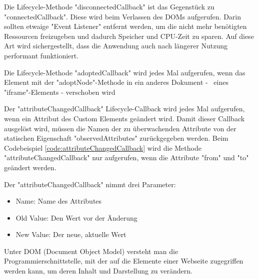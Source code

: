 
Die Lifecycle-Methode "{\ttfamily disconnectedCallback}" ist das Gegenstück zu \linebreak "{\ttfamily connectedCallback}".
Diese wird beim Verlassen des DOMs aufgerufen. Darin sollten etwaige "Event Listener" entfernt werden, um die nicht mehr benötigten Ressourcen freizugeben und dadurch Speicher und CPU-Zeit zu sparen. 
Auf diese Art wird sichergestellt, dass die Anwendung auch nach längerer Nutzung performant funktioniert. \cite{MDNWebCustomElements}


Die Lifecycle-Methode "{\ttfamily adoptedCallback}" wird jedes Mal aufgerufen, wenn das Element mit der "{\ttfamily adoptNode}"-Methode in ein anderes Dokument - \zb\ eines "{\ttfamily iframe}"-Elements - verschoben wird \cite{MDNWebCustomElements}


Der "{\ttfamily attributeChangedCallback}" Lifecycle-Callback wird jedes Mal aufgerufen, wenn ein Attribut des Custom Elements geändert wird. 
Damit dieser Callback ausgelöst wird, müssen die Namen der zu überwachenden Attribute von der statischen Eigenschaft "{\ttfamily observedAttributes}" zurückgegeben werden. \cite{MDNWebCustomElements} Beim Codebeispiel \ref{code:attributeChangedCallback} wird die Methode "{\ttfamily attributeChangedCallback}" nur aufgerufen, wenn die Attribute "from" und "to" geändert werden.
    
Der "{\ttfamily attributeChangedCallback}" nimmt drei Parameter\cite{MDNWebCustomElements}:
\begin{itemize}
    \item Name: Name des Attributes
    \item Old Value: Den Wert vor der Änderung
    \item New Value: Der neue, aktuelle Wert 
\end{itemize}


\pagebreak
{}

Unter DOM (Document Object Model) versteht man die Programmierschnittstelle, mit der auf die Elemente einer Webseite zugegriffen werden kann, um deren Inhalt und Darstellung zu verändern. \cite{MDNDOM}

